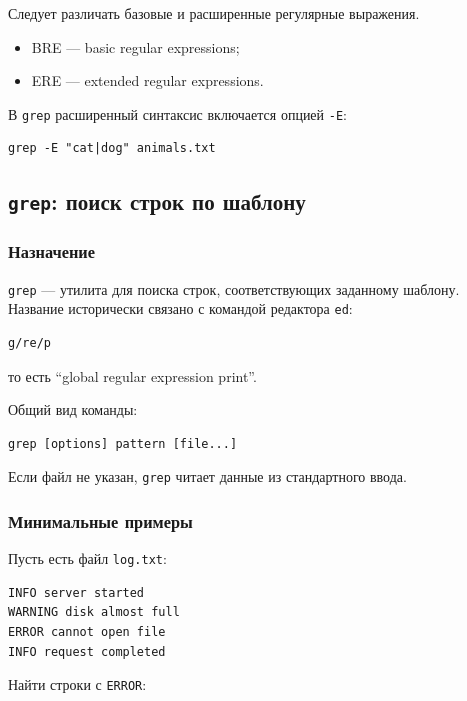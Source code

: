 \documentclass[12pt,a4paper]{article}
\begin{document}
Следует различать базовые и расширенные регулярные выражения.

\begin{itemize}
    \item BRE --- basic regular expressions;
    \item ERE --- extended regular expressions.
\end{itemize}

В \texttt{grep} расширенный синтаксис включается опцией \texttt{-E}:

\begin{verbatim}
grep -E "cat|dog" animals.txt
\end{verbatim}

\subsection{\texttt{grep}: поиск строк по шаблону}

\subsubsection{Назначение}

\texttt{grep} --- утилита для поиска строк, соответствующих заданному шаблону. Название исторически связано с командой редактора \texttt{ed}:

\begin{verbatim}
g/re/p
\end{verbatim}

то есть ``global regular expression print''.

Общий вид команды:

\begin{verbatim}
grep [options] pattern [file...]
\end{verbatim}

Если файл не указан, \texttt{grep} читает данные из стандартного ввода.

\subsubsection{Минимальные примеры}

Пусть есть файл \texttt{log.txt}:

\begin{verbatim}
INFO server started
WARNING disk almost full
ERROR cannot open file
INFO request completed
\end{verbatim}

Найти строки с \texttt{ERROR}:
\end{document}

